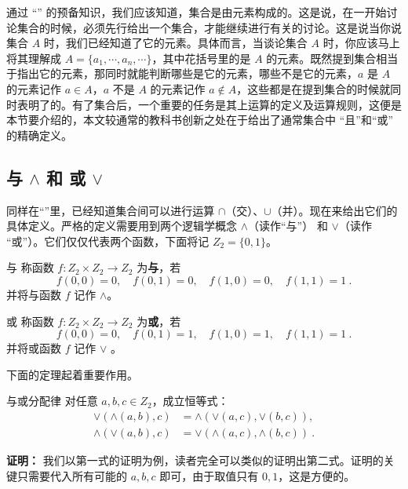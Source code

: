 
通过 “” 的预备知识，我们应该知道，集合是由元素构成的。这是说，在一开始讨论集合的时候，必须先行给出一个集合，才能继续进行有关的讨论。这是说当你说集合 $A$ 时，我们已经知道了它的元素。具体而言，当谈论集合 $A$ 时，你应该马上将其理解成 $A=\{a_1,\cdots,a_n,\cdots\}$，其中花括号里的是 $A$ 的元素。既然提到集合相当于指出它的元素，那同时就能判断哪些是它的元素，哪些不是它的元素，$a$ 是 $A$ 的元素记作 $a\in A$，$a$ 不是 $A$ 的元素记作 $a\notin A$，这些都是在提到集合的时候就同时表明了的。有了集合后，一个重要的任务是其上运算的定义及运算规则，这便是本节要介绍的，本文较通常的教科书创新之处在于给出了通常集合中 “且”和“或” 的精确定义。
\subsection{与 $\land$ 和 或 $\lor$}
同样在“”里，已经知道集合间可以进行运算 $\cap$（交）、$\cup$（并）。现在来给出它们的具体定义。严格的定义需要用到两个逻辑学概念 $\land$（读作“与”） 和 $\lor$（读作 “或”）。它们仅仅代表两个函数，下面将记 $Z_2=\{0,1\}$。
\begin{definition}{与}\label{def_OpSet_2}
称函数 $f:Z_2\times Z_2\rightarrow Z_2$ 为\textbf{与}，若
\begin{equation}
f(0,0)=0,\quad f(0,1)=0,\quad f(1,0)=0,\quad f(1,1)=1~.
\end{equation}
并将与函数 $f$ 记作 $\land$。
\end{definition}
\begin{definition}{或}\label{def_OpSet_1}
称函数 $f:Z_2\times Z_2\rightarrow Z_2$ 为\textbf{或}，若
\begin{equation}
f(0,0)=0,\quad f(0,1)=1,\quad f(1,0)=1,\quad f(1,1)=1~.
\end{equation}
并将或函数 $f$ 记作 $\lor$ 。
\end{definition}
下面的定理起着重要作用。
\begin{theorem}{与或分配律}\label{the_OpSet_1}
对任意 $a,b,c\in Z_2$，成立恒等式：
\begin{equation}\label{eq_OpSet_1}
\begin{aligned}
\lor(\land(a,b),c)&=\land(\lor(a,c),\lor(b,c)),\\
\land(\lor(a,b),c)&=\lor(\land(a,c),\land(b,c))~.
\end{aligned}
\end{equation}
\end{theorem}
\textbf{证明：}
我们以第一式的证明为例，读者完全可以类似的证明出第二式。证明的关键只需要代入所有可能的 $a,b,c$ 即可，由于取值只有 $0,1$，这是方便的。

